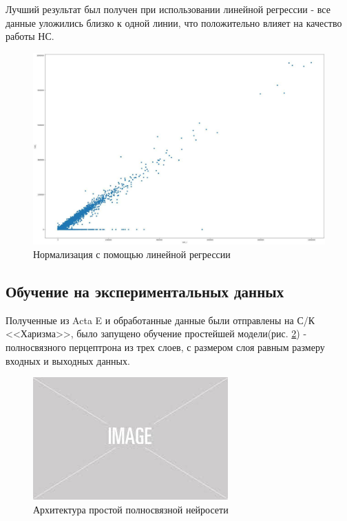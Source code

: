 \documentclass{article}
\begin{document}
Лучший результат был получен при использовании линейной регрессии - все данные уложились близко к одной линии, что положительно влияет на качество работы НС.

\begin{figure}[!htp]
\includegraphics[width=\linewidth]{imgs/dist_lr.jpg}
  \caption{Нормализация с помощью линейной регрессии}\label{img:dist_lr}
\end{figure}

\subsection{Обучение на экспериментальных данных}
Полученные из Acta E и обработанные данные были отправлены на С/К <<Харизма>>, было запущено обучение простейшей модели(рис. \ref{img:model1}) - полносвязного перцептрона из трех слоев, с размером слоя равным размеру входных и выходных данных.  

\begin{figure}[!htp]
\includegraphics[width=\linewidth]{imgs/placeholder.jpeg}
\caption{Архитектура простой полносвязной нейросети}
\label{img:model1}
\end{figure}
\end{document}
